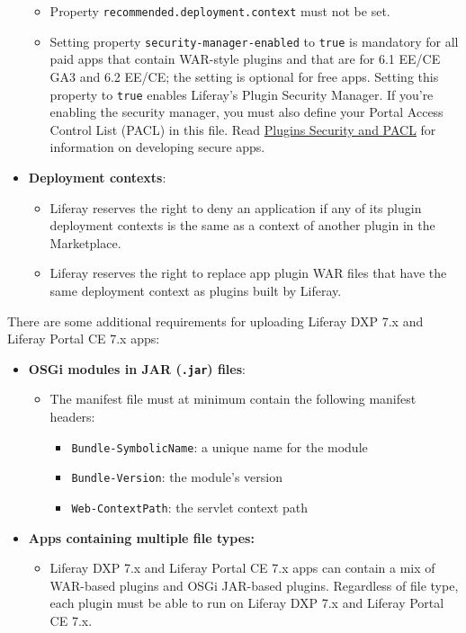 \begin{itemize}
  \begin{itemize}
  \tightlist
  \item
    Property \texttt{recommended.deployment.context} must not be set.
  \item
    Setting property \texttt{security-manager-enabled} to \texttt{true}
    is mandatory for all paid apps that contain WAR-style plugins and
    that are for 6.1 EE/CE GA3 and 6.2 EE/CE; the setting is optional
    for free apps. Setting this property to \texttt{true} enables
    Liferay's Plugin Security Manager. If you're enabling the security
    manager, you must also define your Portal Access Control List (PACL)
    in this file. Read
    \href{/docs/6-2/tutorials/-/knowledge_base/t/plugin-security-and-pacl}{Plugins
    Security and PACL} for information on developing secure apps.
  \end{itemize}
\item
  \textbf{Deployment contexts}:

  \begin{itemize}
  \tightlist
  \item
    Liferay reserves the right to deny an application if any of its
    plugin deployment contexts is the same as a context of another
    plugin in the Marketplace.
  \item
    Liferay reserves the right to replace app plugin WAR files that have
    the same deployment context as plugins built by Liferay.
  \end{itemize}
\end{itemize}

There are some additional requirements for uploading Liferay DXP 7.x and
Liferay Portal CE 7.x apps:

\begin{itemize}
\tightlist
\item
  \textbf{OSGi modules in JAR (\texttt{.jar}) files}:

  \begin{itemize}
  \tightlist
  \item
    The manifest file must at minimum contain the following manifest
    headers:

    \begin{itemize}
    \tightlist
    \item
      \texttt{Bundle-SymbolicName}: a unique name for the module
    \item
      \texttt{Bundle-Version}: the module's version
    \item
      \texttt{Web-ContextPath}: the servlet context path
    \end{itemize}
  \end{itemize}
\item
  \textbf{Apps containing multiple file types:}

  \begin{itemize}
  \tightlist
  \item
    Liferay DXP 7.x and Liferay Portal CE 7.x apps can contain a mix of
    WAR-based plugins and OSGi JAR-based plugins. Regardless of file
    type, each plugin must be able to run on Liferay DXP 7.x and Liferay
    Portal CE 7.x.
  \end{itemize}
\end{itemize}

